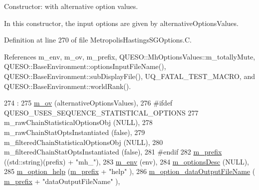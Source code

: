 Constructor\-: with alternative option values. 

In this constructor, the input options are given by {\ttfamily alternative\-Options\-Values}. 

Definition at line 270 of file Metropolis\-Hastings\-S\-G\-Options.\-C.



References m\-\_\-env, m\-\_\-ov, m\-\_\-prefix, Q\-U\-E\-S\-O\-::\-Mh\-Options\-Values\-::m\-\_\-totally\-Mute, Q\-U\-E\-S\-O\-::\-Base\-Environment\-::options\-Input\-File\-Name(), Q\-U\-E\-S\-O\-::\-Base\-Environment\-::sub\-Display\-File(), U\-Q\-\_\-\-F\-A\-T\-A\-L\-\_\-\-T\-E\-S\-T\-\_\-\-M\-A\-C\-R\-O, and Q\-U\-E\-S\-O\-::\-Base\-Environment\-::world\-Rank().


\begin{DoxyCode}
274   :
275   \hyperlink{class_q_u_e_s_o_1_1_metropolis_hastings_s_g_options_a9d4792d9fc2dc5439b8ab489b0c236eb}{m\_ov}                                               (alternativeOptionsValues),
276 \textcolor{preprocessor}{#ifdef QUESO\_USES\_SEQUENCE\_STATISTICAL\_OPTIONS}
277 \textcolor{preprocessor}{}  m\_rawChainStatisticalOptionsObj                    (NULL),
278   m\_rawChainStatOptsInstantiated                     (\textcolor{keyword}{false}),
279   m\_filteredChainStatisticalOptionsObj               (NULL),
280   m\_filteredChainStatOptsInstantiated                (\textcolor{keyword}{false}),
281 \textcolor{preprocessor}{#endif}
282 \textcolor{preprocessor}{}  \hyperlink{class_q_u_e_s_o_1_1_metropolis_hastings_s_g_options_a4f7c510aaa530336d24259e2a89f5d0b}{m\_prefix}                                           ((std::string)(prefix) + \textcolor{stringliteral}{"mh\_"}),
283   \hyperlink{class_q_u_e_s_o_1_1_metropolis_hastings_s_g_options_a328a978b771885e14d536272ff4aa9ef}{m\_env}                                              (env),
284   \hyperlink{class_q_u_e_s_o_1_1_metropolis_hastings_s_g_options_a1a2cf22fbccd0bac761d9ee610edc16f}{m\_optionsDesc}                                      (NULL),
285   \hyperlink{class_q_u_e_s_o_1_1_metropolis_hastings_s_g_options_af73e79036b108974843e26bc036c70ce}{m\_option\_help}                                      (\hyperlink{class_q_u_e_s_o_1_1_metropolis_hastings_s_g_options_a4f7c510aaa530336d24259e2a89f5d0b}{m\_prefix} + \textcolor{stringliteral}{"help"}               
                             ),
286   \hyperlink{class_q_u_e_s_o_1_1_metropolis_hastings_s_g_options_ae5efdb40f8282073ebcad5892af4be44}{m\_option\_dataOutputFileName}                        (
      \hyperlink{class_q_u_e_s_o_1_1_metropolis_hastings_s_g_options_a4f7c510aaa530336d24259e2a89f5d0b}{m\_prefix} + \textcolor{stringliteral}{"dataOutputFileName"}                        ),

\end{DoxyCode}
